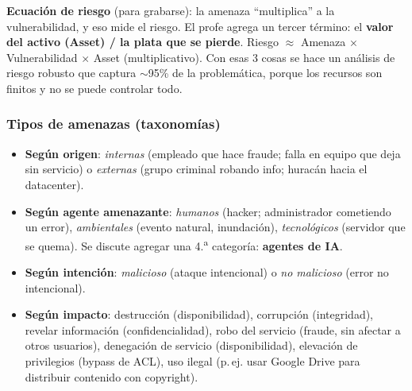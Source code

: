 \documentclass[../main.tex]{subfiles}
\begin{document}
\begin{examen}
\textbf{Ecuación de riesgo} (para grabarse): la amenaza ``multiplica'' a la vulnerabilidad, y eso mide el riesgo. El profe agrega un tercer término: el \textbf{valor del activo (Asset) / la plata que se pierde}. Riesgo $\approx$ Amenaza $\times$ Vulnerabilidad $\times$ Asset (multiplicativo). Con esas 3 cosas se hace un análisis de riesgo robusto que captura $\sim$95\% de la problemática, porque los recursos son finitos y no se puede controlar todo.
\end{examen}

\subsubsection{Tipos de amenazas (taxonomías)}
\begin{itemize}
  \item \textbf{Según origen}: \emph{internas} (empleado que hace fraude; falla en equipo que deja sin servicio) o \emph{externas} (grupo criminal robando info; huracán hacia el datacenter).
  \item \textbf{Según agente amenazante}: \emph{humanos} (hacker; administrador cometiendo un error), \emph{ambientales} (evento natural, inundación), \emph{tecnológicos} (servidor que se quema). Se discute agregar una 4.\textsuperscript{a} categoría: \textbf{agentes de IA}.
  \item \textbf{Según intención}: \emph{malicioso} (ataque intencional) o \emph{no malicioso} (error no intencional).
  \item \textbf{Según impacto}: destrucción (disponibilidad), corrupción (integridad), revelar información (confidencialidad), robo del servicio (fraude, sin afectar a otros usuarios), denegación de servicio (disponibilidad), elevación de privilegios (bypass de ACL), uso ilegal (p.\,ej. usar Google Drive para distribuir contenido con copyright).
\end{itemize}
\end{document}
